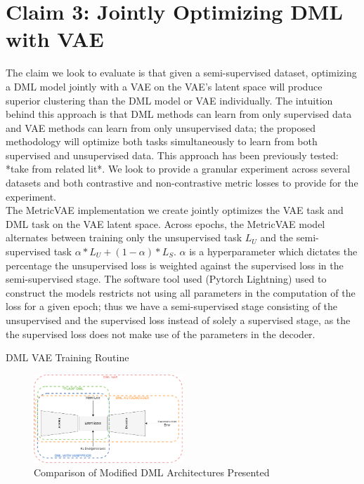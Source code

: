 \documentclass[./dissertation.tex]{subfiles}
\begin{document}
    \section{Claim 3: Jointly Optimizing DML with VAE}
    The claim we look to evaluate is that given a semi-supervised dataset, optimizing a DML model jointly with a VAE on the VAE’s latent space will produce superior clustering than the DML model or VAE individually. The intuition behind this approach is that DML methods can learn from only supervised data and VAE methods can learn from only unsupervised data; the proposed methodology will optimize both tasks simultaneously to learn from both supervised and unsupervised data. This approach has been previously tested: *take from related lit*. We look to provide a granular experiment across several datasets and both contrastive and non-contrastive metric losses to provide for the experiment.  \\
    
    The MetricVAE implementation we create jointly optimizes the VAE task and DML task on the VAE latent space. Across epochs, the MetricVAE model alternates between training only the unsupervised task $L_{U}$ and the semi-supervised task $\alpha * L_{U} + (1 - \alpha) * L_{S}$. $\alpha$ is a hyperparameter which dictates the percentage the unsupervised loss is weighted against the supervised loss in the semi-supervised stage. The software tool used (Pytorch Lightning) used to construct the models restricts not using all parameters in the computation of the loss for a given epoch; thus we have a semi-supervised stage consisting of the unsupervised and the supervised loss instead of solely a supervised stage, as the the supervised loss does not make use of the parameters in the decoder. 
    
    \begin{algorithm}
    \caption{DML VAE Training Routine}\label{alg:two}
    \end{algorithm}

    \begin{figure}[h]
        \centering\includegraphics[width=0.5\textwidth]{figures/DML_Arcs.drawio.png}
        \caption{Comparison of Modified DML Architectures Presented}
        \label{Triplet Loss Diagram}
    \end{figure}

    
\end{document}
